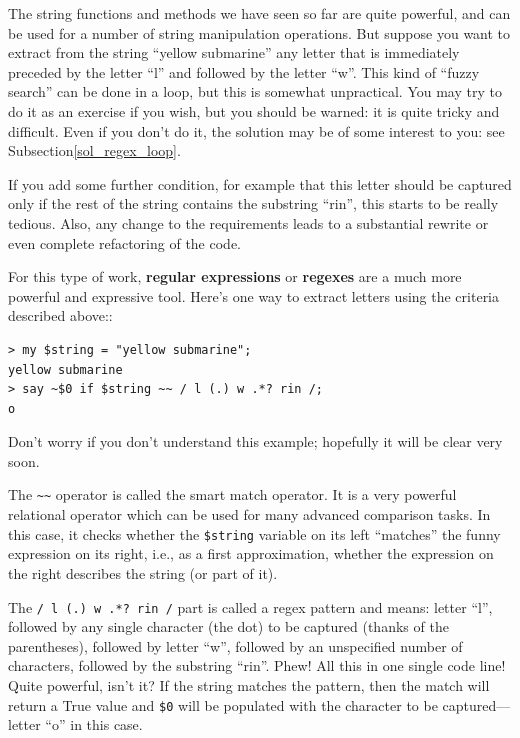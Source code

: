The string functions and methods we have seen so far are 
quite powerful, and can be used for a number of string 
manipulation operations. But suppose you want to extract 
from the string ``yellow submarine'' any letter that is 
immediately preceded by the letter ``l'' and followed by 
the letter ``w''. This kind of ``fuzzy search'' 
can be done in a loop, but this is 
somewhat unpractical. You may try to do it as an exercise if 
you wish, but you should be warned: it is quite tricky and 
difficult. Even if you don't do it, the solution may be of some 
interest to you: see Subsection\ref{sol_regex_loop}. 
\label{regex_loop}


If you add some further condition, 
for example that this letter should be captured only if 
the rest of the string contains the substring ``rin'', 
this starts to be really tedious. Also, any change to the 
requirements leads to a substantial rewrite or even 
complete refactoring of the code.

For this type of work, {\bf regular expressions} or 
{\bf regexes}  are a much more powerful and expressive tool. 
Here's one way to extract letters using the criteria 
described above::

\begin{verbatim}
> my $string = "yellow submarine";
yellow submarine
> say ~$0 if $string ~~ / l (.) w .*? rin /;
o
\end{verbatim}

Don't worry if you don't understand this example; 
hopefully it will be clear very soon.

The \verb'~~' operator is called the smart match operator. It is 
a very powerful relational operator which can be used for 
many advanced comparison tasks. In this case, it checks whether 
the {\tt \$string} variable on its left ``matches''  
the funny expression on its right, i.e., as a first 
approximation, whether the expression on the right describes 
the string (or part of it). 

The \verb'/ l (.) w .*? rin /' part is called a regex pattern and means: 
letter ``l'', followed by any single character (the dot) to be 
captured (thanks of the parentheses), followed by letter ``w'', 
followed by an unspecified number of characters, followed by the 
substring ``rin''. Phew! All this in one single code line! Quite 
powerful, isn't it? If the string matches the pattern, then 
the match will return a True value and \verb'$0' will be 
populated with the character to be captured---letter ``o'' 
in this case.

